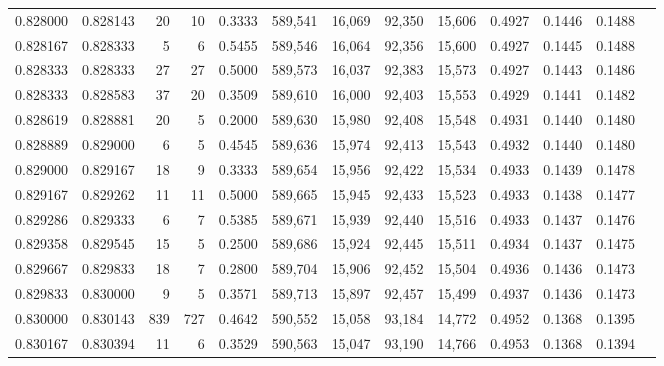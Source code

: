 \begin{tabular}{rrrrrrrrrrrrr}
0.828000 & 0.828143 &    20 &  10 &                                     0.3333 & 589,541 &  16,069 &  92,350 &  15,606 & 0.4927 & 0.1446 & 0.1488 \\
0.828167 & 0.828333 &     5 &   6 &                                     0.5455 & 589,546 &  16,064 &  92,356 &  15,600 & 0.4927 & 0.1445 & 0.1488 \\
0.828333 & 0.828333 &    27 &  27 &                                     0.5000 & 589,573 &  16,037 &  92,383 &  15,573 & 0.4927 & 0.1443 & 0.1486 \\
0.828333 & 0.828583 &    37 &  20 &                                     0.3509 & 589,610 &  16,000 &  92,403 &  15,553 & 0.4929 & 0.1441 & 0.1482 \\
0.828619 & 0.828881 &    20 &   5 &                                     0.2000 & 589,630 &  15,980 &  92,408 &  15,548 & 0.4931 & 0.1440 & 0.1480 \\
0.828889 & 0.829000 &     6 &   5 &                                     0.4545 & 589,636 &  15,974 &  92,413 &  15,543 & 0.4932 & 0.1440 & 0.1480 \\
0.829000 & 0.829167 &    18 &   9 &                                     0.3333 & 589,654 &  15,956 &  92,422 &  15,534 & 0.4933 & 0.1439 & 0.1478 \\
0.829167 & 0.829262 &    11 &  11 &                                     0.5000 & 589,665 &  15,945 &  92,433 &  15,523 & 0.4933 & 0.1438 & 0.1477 \\
0.829286 & 0.829333 &     6 &   7 &                                     0.5385 & 589,671 &  15,939 &  92,440 &  15,516 & 0.4933 & 0.1437 & 0.1476 \\
0.829358 & 0.829545 &    15 &   5 &                                     0.2500 & 589,686 &  15,924 &  92,445 &  15,511 & 0.4934 & 0.1437 & 0.1475 \\
0.829667 & 0.829833 &    18 &   7 &                                     0.2800 & 589,704 &  15,906 &  92,452 &  15,504 & 0.4936 & 0.1436 & 0.1473 \\
0.829833 & 0.830000 &     9 &   5 &                                     0.3571 & 589,713 &  15,897 &  92,457 &  15,499 & 0.4937 & 0.1436 & 0.1473 \\
0.830000 & 0.830143 &   839 & 727 &                                     0.4642 & 590,552 &  15,058 &  93,184 &  14,772 & 0.4952 & 0.1368 & 0.1395 \\
0.830167 & 0.830394 &    11 &   6 &                                     0.3529 & 590,563 &  15,047 &  93,190 &  14,766 & 0.4953 & 0.1368 & 0.1394 \\

\end{tabular}
